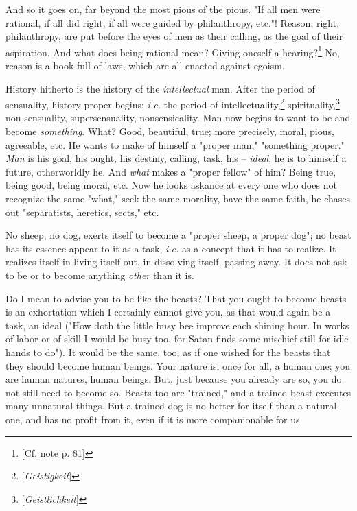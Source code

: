 And so it goes on, far beyond the most pious of the pious. "{}If all men were 
rational, if all did right, if all were guided by philanthropy, etc."{}! 
Reason, right, philanthropy, are put before the eyes of men as their calling, 
as the goal of their aspiration. And what does being rational mean? Giving 
oneself a hearing?\footnote{[Cf. note p. 81]} No, reason is a book full of 
laws, which are all enacted against egoism.

History hitherto is the history of the \textit{intellectual} man. After the 
period of sensuality, history proper begins; \textit{i.e.} the period of 
intellectuality,\footnote{[\textit{Geistigkeit}]} 
spirituality,\footnote{[\textit{Geistlichkeit}]} non-sensuality, 
supersensuality, nonsensicality. Man now begins to want to be and become 
\textit{something}. What? Good, beautiful, true; more precisely, moral, pious, 
agreeable, etc. He wants to make of himself a "{}proper man,"{} "{}something 
proper."{} \textit{Man} is his goal, his ought, his destiny, calling, task, 
his -- \textit{ideal}; he is to himself a future, otherworldly he. And 
\textit{what} makes a "{}proper fellow"{} of him? Being true, being good, 
being moral, etc. Now he looks askance at every one who does not recognize the 
same "{}what,"{} seek the same morality, have the same faith, he chases out 
"{}separatists, heretics, sects,"{} etc.

No sheep, no dog, exerts itself to become a "{}proper sheep, a proper dog"{}; 
no beast has its essence appear to it as a task, \textit{i.e.} as a concept 
that it has to realize. It realizes itself in living itself out, in dissolving 
itself, passing away. It does not ask to be or to become anything 
\textit{other} than it is.

Do I mean to advise you to be like the beasts? That you ought to become beasts 
is an exhortation which I certainly cannot give you, as that would again be a 
task, an ideal ("{}How doth the little busy bee improve each shining hour. In 
works of labor or of skill I would be busy too, for Satan finds some mischief 
still for idle hands to do"{}). It would be the same, too, as if one wished 
for the beasts that they should become human beings. Your nature is, once for 
all, a human one; you are human natures, human beings. But, just because you 
already are so, you do not still need to become so. Beasts too are 
"{}trained,"{} and a trained beast executes many unnatural things. But a 
trained dog is no better for itself than a natural one, and has no profit from 
it, even if it is more companionable for us.

